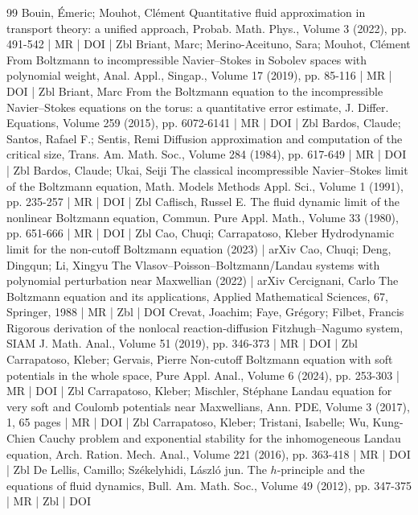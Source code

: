 \documentclass[10pt]{amsart}
\theoremstyle{definition}\newtheorem{defi}[theo]{Definition}\newtheorem{rema}[theo]{Remark}\newtheorem{exam}[theo]{Example}\newtheorem{exem}[theo]{Example}\newtheorem{nota}[theo]{Notation}
\begin{document}
\begin{thebibliography}{99}
 Bouin, Émeric; Mouhot, Clément Quantitative fluid approximation in transport theory: a unified approach, Probab. Math. Phys., Volume 3 (2022), pp. 491-542 | MR | DOI | Zbl
 Briant, Marc; Merino-Aceituno, Sara; Mouhot, Clément From Boltzmann to incompressible Navier–Stokes in Sobolev spaces with polynomial weight, Anal. Appl., Singap., Volume 17 (2019), pp. 85-116 | MR | DOI | Zbl
 Briant, Marc From the Boltzmann equation to the incompressible Navier–Stokes equations on the torus: a quantitative error estimate, J. Differ. Equations, Volume 259 (2015), pp. 6072-6141 | MR | DOI | Zbl
 Bardos, Claude; Santos, Rafael F.; Sentis, Remi Diffusion approximation and computation of the critical size, Trans. Am. Math. Soc., Volume 284 (1984), pp. 617-649 | MR | DOI | Zbl
 Bardos, Claude; Ukai, Seiji The classical incompressible Navier–Stokes limit of the Boltzmann equation, Math. Models Methods Appl. Sci., Volume 1 (1991), pp. 235-257 | MR | DOI | Zbl
 Caflisch, Russel E. The fluid dynamic limit of the nonlinear Boltzmann equation, Commun. Pure Appl. Math., Volume 33 (1980), pp. 651-666 | MR | DOI | Zbl
 Cao, Chuqi; Carrapatoso, Kleber Hydrodynamic limit for the non-cutoff Boltzmann equation (2023) | arXiv
 Cao, Chuqi; Deng, Dingqun; Li, Xingyu The Vlasov–Poisson–Boltzmann/Landau systems with polynomial perturbation near Maxwellian (2022) | arXiv
 Cercignani, Carlo The Boltzmann equation and its applications, Applied Mathematical Sciences, 67, Springer, 1988 | MR | Zbl | DOI
 Crevat, Joachim; Faye, Grégory; Filbet, Francis Rigorous derivation of the nonlocal reaction-diffusion Fitzhugh–Nagumo system, SIAM J. Math. Anal., Volume 51 (2019), pp. 346-373 | MR | DOI | Zbl
 Carrapatoso, Kleber; Gervais, Pierre Non-cutoff Boltzmann equation with soft potentials in the whole space, Pure Appl. Anal., Volume 6 (2024), pp. 253-303 | MR | DOI | Zbl
 Carrapatoso, Kleber; Mischler, Stéphane Landau equation for very soft and Coulomb potentials near Maxwellians, Ann. PDE, Volume 3 (2017), 1, 65 pages | MR | DOI | Zbl
 Carrapatoso, Kleber; Tristani, Isabelle; Wu, Kung-Chien Cauchy problem and exponential stability for the inhomogeneous Landau equation, Arch. Ration. Mech. Anal., Volume 221 (2016), pp. 363-418 | MR | DOI | Zbl
 De Lellis, Camillo; Székelyhidi, László jun. The $h$-principle and the equations of fluid dynamics, Bull. Am. Math. Soc., Volume 49 (2012), pp. 347-375 | MR | Zbl | DOI

\end{thebibliography}
\end{document}
